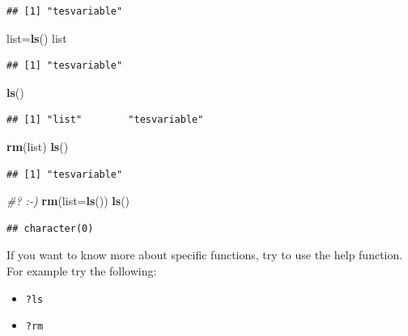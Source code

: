 \documentclass[
]{book}
\newenvironment{Shaded}{\begin{snugshade}}{\end{snugshade}}
\newcommand{\CommentTok}[1]{\textcolor[rgb]{0.56,0.35,0.01}{\textit{#1}}}
\newcommand{\DataTypeTok}[1]{\textcolor[rgb]{0.13,0.29,0.53}{#1}}
\newcommand{\KeywordTok}[1]{\textcolor[rgb]{0.13,0.29,0.53}{\textbf{#1}}}
\newcommand{\NormalTok}[1]{#1}
\providecommand{\tightlist}{%
  \setlength{\itemsep}{0pt}\setlength{\parskip}{0pt}}
\begin{document}
\begin{verbatim}
## [1] "tesvariable"
\end{verbatim}

\begin{Shaded}
\begin{Highlighting}[numbers=left,,]
\NormalTok{list=}\KeywordTok{ls}\NormalTok{()}
\NormalTok{list}
\end{Highlighting}
\end{Shaded}

\begin{verbatim}
## [1] "tesvariable"
\end{verbatim}

\begin{Shaded}
\begin{Highlighting}[numbers=left,,]
\KeywordTok{ls}\NormalTok{()}
\end{Highlighting}
\end{Shaded}

\begin{verbatim}
## [1] "list"        "tesvariable"
\end{verbatim}

\begin{Shaded}
\begin{Highlighting}[numbers=left,,]
\KeywordTok{rm}\NormalTok{(list)}
\KeywordTok{ls}\NormalTok{()}
\end{Highlighting}
\end{Shaded}

\begin{verbatim}
## [1] "tesvariable"
\end{verbatim}

\begin{Shaded}
\begin{Highlighting}[numbers=left,,]
\CommentTok{#? :-)}
\KeywordTok{rm}\NormalTok{(}\DataTypeTok{list=}\KeywordTok{ls}\NormalTok{())}
\KeywordTok{ls}\NormalTok{()}
\end{Highlighting}
\end{Shaded}

\begin{verbatim}
## character(0)
\end{verbatim}

If you want to know more about specific functions, try to use the help function. For example try the following:

\begin{itemize}
\tightlist
\item
  \texttt{?ls}
\item
  \texttt{?rm}
\end{itemize}
\end{document}
